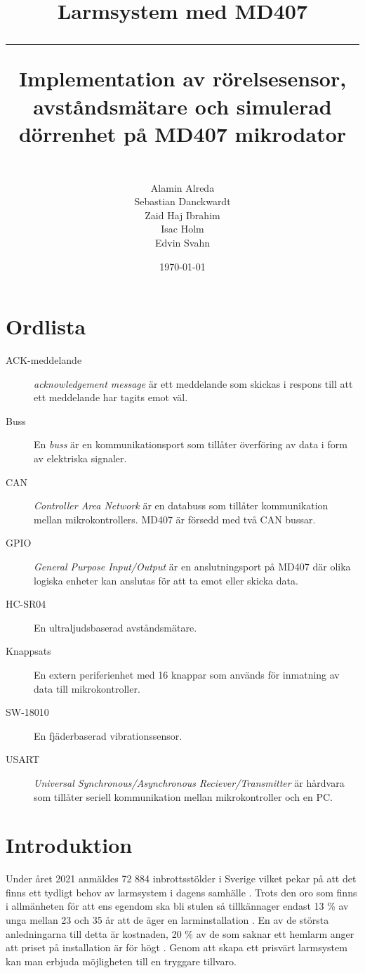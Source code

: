 \documentclass{article}
\title{\textbf{Larmsystem med MD407}\\ 
\hspace{10cm}
\hrule
\hspace{10cm}
Implementation av rörelsesensor, avståndsmätare och simulerad dörrenhet på MD407 mikrodator}
\author{\\Alamin Alreda\\Sebastian Danckwardt\\Zaid Haj Ibrahim\\Isac Holm\\Edvin Svahn}
\date{\today}
\begin{document}
\maketitle
\newpage
\tableofcontents
\newpage
\section*{Ordlista}
\begin{description}

\item[ACK-meddelande] \emph{acknowledgement message} är ett meddelande som skickas i respons till att ett meddelande har tagits emot väl.

\item[Buss] En \emph{buss} är en kommunikationsport som tillåter överföring av data i form av elektriska signaler.

\item[CAN] \emph{Controller Area Network} är en databuss som tillåter kommunikation mellan mikrokontrollers. MD407 är försedd med två CAN bussar.

\item[GPIO] \emph{General Purpose Input/Output} är en anslutningsport på MD407 där olika logiska enheter kan anslutas för att ta emot eller skicka data.

\item[HC-SR04] En ultraljudsbaserad avståndsmätare.

\item[Knappsats] En extern periferienhet med 16 knappar som används för inmatning av data till mikrokontroller.

\item[SW-18010] En fjäderbaserad vibrationssensor.

\item[USART] \emph{Universal Synchronous/Asynchronous Reciever/Transmitter} är hårdvara som tillåter seriell kommunikation mellan mikrokontroller och en PC.

\end{description}
 \newpage

\setcounter{page}{1}
\section{Introduktion}

Under året 2021 anmäldes 72 884 inbrottsstölder i Sverige vilket pekar på att det finns ett tydligt behov av larmsystem i dagens samhälle \cite{BRa}.
Trots den oro som finns i allmänheten för att ens egendom ska bli stulen så tillkännager endast 13 \% av unga mellan 23 och 35 år att de äger en larminstallation \cite{MoFor}.
En av de största anledningarna till detta är kostnaden, 20 \% av de som saknar ett hemlarm anger att priset på installation är för högt \cite{MoFor}.
Genom att skapa ett prisvärt larmsystem kan man erbjuda möjligheten till en tryggare tillvaro.
\end{document}
